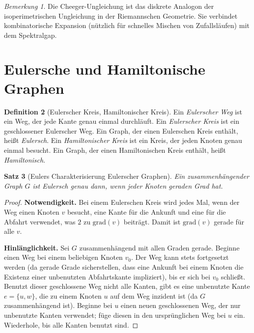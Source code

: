 \documentclass[12pt,a4paper]{amsart}
\newtheorem{theorem}{Satz}[section]
\theoremstyle{definition}
\newtheorem{definition}[theorem]{Definition}
\theoremstyle{remark}
\newtheorem{remark}[theorem]{Bemerkung}
\newcommand{\grad}{\mathrm{grad}}
\begin{document}
\begin{remark}
Die Cheeger-Ungleichung ist das diskrete Analogon der isoperimetrischen
Ungleichung in der Riemannschen Geometrie. Sie verbindet kombinatorische
Expansion (nützlich für schnelles Mischen von Zufallsläufen) mit dem
Spektralgap.
\end{remark}

\section{Eulersche und Hamiltonische Graphen}
\label{sec:euler_hamilton}

\begin{definition}[Eulerscher Kreis, Hamiltonischer Kreis]
Ein \emph{Eulerscher Weg} ist ein Weg, der jede Kante genau einmal durchläuft.
Ein \emph{Eulerscher Kreis} ist ein geschlossener Eulerscher Weg. Ein Graph,
der einen Eulerschen Kreis enthält, heißt \emph{Eulersch}. Ein
\emph{Hamiltonischer Kreis} ist ein Kreis, der jeden Knoten genau einmal
besucht. Ein Graph, der einen Hamiltonischen Kreis enthält, heißt
\emph{Hamiltonisch}.
\end{definition}

\begin{theorem}[Eulers Charakterisierung Eulerscher Graphen]
\label{satz:eulersch}
Ein zusammenhängender Graph $G$ ist Eulersch genau dann, wenn jeder Knoten
geraden Grad hat.
\end{theorem}

\begin{proof}
\textbf{Notwendigkeit.} Bei einem Eulerschen Kreis wird jedes Mal, wenn der
Weg einen Knoten $v$ besucht, eine Kante für die Ankunft und eine für die
Abfahrt verwendet, was $2$ zu $\grad(v)$ beiträgt. Damit ist $\grad(v)$ gerade
für alle $v$.

\textbf{Hinlänglichkeit.} Sei $G$ zusammenhängend mit allen Graden gerade.
Beginne einen Weg bei einem beliebigen Knoten $v_0$. Der Weg kann stets
fortgesetzt werden (da gerade Grade sicherstellen, dass eine Ankunft bei einem
Knoten die Existenz einer unbenutzten Abfahrtskante impliziert), bis er sich
bei $v_0$ schließt. Benutzt dieser geschlossene Weg nicht alle Kanten, gibt
es eine unbenutzte Kante $e = \{u, w\}$, die zu einem Knoten $u$ auf dem Weg
inzident ist (da $G$ zusammenhängend ist). Beginne bei $u$ einen neuen
geschlossenen Weg, der nur unbenutzte Kanten verwendet; füge diesen in den
ursprünglichen Weg bei $u$ ein. Wiederhole, bis alle Kanten benutzt sind.
\end{proof}
\end{document}
